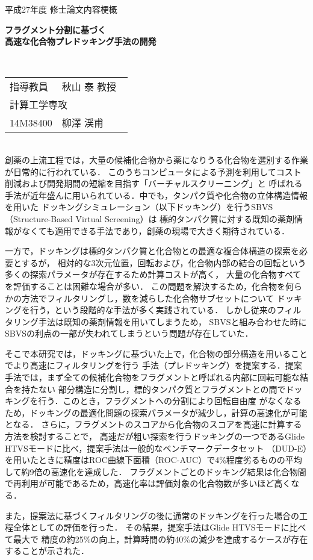 {
 \thispagestyle{empty}
 \large
 \noindent
 平成27年度 修士論文内容梗概
　\\
 \begin{center}
  \textbf{\LARGE フラグメント分割に基づく\\高速な化合物プレドッキング手法の開発}
 \end{center}
　\\
 \hfill 
 \begin{tabular}{llll}
 指導教員& \multicolumn{3}{l}{秋山 泰 教授} \\
  \multicolumn{4}{l}{計算工学専攻} \\
 14M38400\hspace{.5cm} & {柳澤 渓甫}
 \end{tabular}

\mbox{}\\

創薬の上流工程では，大量の候補化合物から薬になりうる化合物を選別する作業が日常的に行われている．
このうちコンピュータによる予測を利用してコスト削減および開発期間の短縮を目指す「バーチャルスクリーニング」と
呼ばれる手法が近年盛んに用いられている．中でも，タンパク質や化合物の立体構造情報を用いた
ドッキングシミュレーション（以下ドッキング）を行うSBVS（Structure-Based Virtual Screening）は
標的タンパク質に対する既知の薬剤情報がなくても適用できる手法であり，創薬の現場で大きく期待されている．

一方で，ドッキングは標的タンパク質と化合物との最適な複合体構造の探索を必要とするが，
相対的な3次元位置，回転および，化合物内部の結合の回転という多くの探索パラメータが存在するため計算コストが高く，
大量の化合物すべてを評価することは困難な場合が多い．
この問題を解決するため，化合物を何らかの方法でフィルタリングし，数を減らした化合物サブセットについて
ドッキングを行う，という段階的な手法が多く実践されている．
しかし従来のフィルタリング手法は既知の薬剤情報を用いてしまうため，
SBVSと組み合わせた時にSBVSの利点の一部が失われてしまうという問題が存在していた．

そこで本研究では，ドッキングに基づいた上で，化合物の部分構造を用いることでより高速にフィルタリングを行う
手法（プレドッキング）を提案する．提案手法では，まず全ての候補化合物をフラグメントと呼ばれる内部に回転可能な結合を持たない
部分構造に分割し，標的タンパク質とフラグメントとの間でドッキングを行う．このとき，フラグメントへの分割により回転自由度
がなくなるため，ドッキングの最適化問題の探索パラメータが減少し，計算の高速化が可能となる．
さらに，フラグメントのスコアから化合物のスコアを高速に計算する方法を検討することで，
高速だが粗い探索を行うドッキングの一つであるGlide HTVSモードに比べ，提案手法は一般的なベンチマークデータセット
（DUD-E）を用いたときに精度はROC曲線下面積（ROC-AUC）で4\%程度劣るものの平均して約9倍の高速化を達成した．
フラグメントごとのドッキング結果は化合物間で再利用が可能であるため，高速化率は評価対象の化合物数が多いほど高くなる．

また，提案法に基づくフィルタリングの後に通常のドッキングを行った場合の工程全体としての評価を行った．
その結果，提案手法はGlide HTVSモードに比べて最大で
精度の約25\%の向上，計算時間の約40\%の減少を達成するケースが存在することが示された．

\thispagestyle{empty}
\addtocounter{page}{-1}
}
